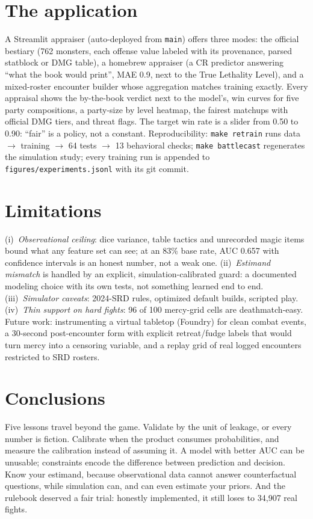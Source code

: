 \documentclass[10pt]{article}
\newcommand{\code}[1]{\texttt{\small #1}}
\begin{document}
\section{The application}
A Streamlit appraiser (auto-deployed from \code{main}) offers three modes: the
official bestiary (762 monsters, each offense value labeled with its provenance,
parsed statblock or DMG table), a homebrew appraiser (a CR predictor answering
``what the book would print'', MAE 0.9, next to the True Lethality Level), and a
mixed-roster encounter builder whose aggregation matches training exactly. Every
appraisal shows the by-the-book verdict next to the model's, win curves for five
party compositions, a party-size by level heatmap, the fairest matchups with
official DMG tiers, and threat flags. The target win rate is a slider from 0.50 to
0.90: ``fair'' is a policy, not a constant. Reproducibility: \code{make retrain}
runs data $\to$ training $\to$ 64 tests $\to$ 13 behavioral checks;
\code{make battlecast} regenerates the simulation study; every training run is
appended to \code{figures/experiments.jsonl} with its git commit.

\section{Limitations}
(i)~\emph{Observational ceiling}: dice variance, table tactics and unrecorded
magic items bound what any feature set can see; at an 83\% base rate, AUC 0.657
with confidence intervals is an honest number, not a weak one.
(ii)~\emph{Estimand mismatch} is handled by an explicit, simulation-calibrated
guard: a documented modeling choice with its own tests, not something learned end
to end. (iii)~\emph{Simulator caveats}: 2024-SRD rules, optimized default builds,
scripted play. (iv)~\emph{Thin support on hard fights}: 96 of 100 mercy-grid cells
are deathmatch-easy. Future work: instrumenting a virtual tabletop (Foundry) for
clean combat events, a 30-second post-encounter form with explicit retreat/fudge
labels that would turn mercy into a censoring variable, and a replay grid of real
logged encounters restricted to SRD rosters.

\section{Conclusions}
Five lessons travel beyond the game. Validate by the unit of leakage, or every
number is fiction. Calibrate when the product consumes probabilities, and measure
the calibration instead of assuming it. A model with better AUC can be unusable;
constraints encode the difference between prediction and decision. Know your
estimand, because observational data cannot answer counterfactual questions, while
simulation can, and can even estimate your priors. And the rulebook deserved a
fair trial: honestly implemented, it still loses to 34{,}907 real fights.
\end{document}
